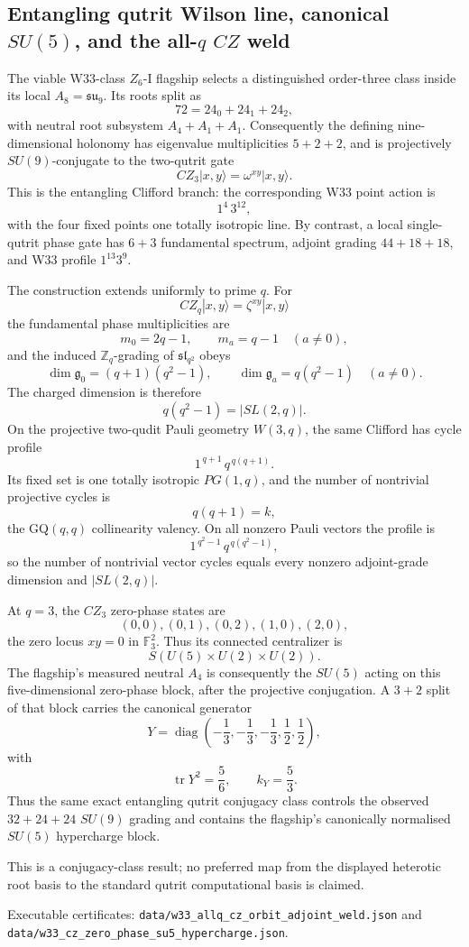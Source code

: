 \subsection{Entangling qutrit Wilson line, canonical \(SU(5)\), and the all-\(q\) \(CZ\) weld}
\label{sec:20260918-cz-su5-allq}

The viable W33-class \(Z_6\)-I flagship selects a distinguished order-three
class inside its local \(A_8=\mathfrak{su}_9\).  Its roots split as
\[
72=24_0+24_1+24_2,
\]
with neutral root subsystem \(A_4+A_1+A_1\).  Consequently the defining
nine-dimensional holonomy has eigenvalue multiplicities \(5+2+2\), and is
projectively \(SU(9)\)-conjugate to the two-qutrit gate
\[
CZ_3|x,y\rangle=\omega^{xy}|x,y\rangle.
\]
This is the entangling Clifford branch: the corresponding W33 point action is
\[
1^4\,3^{12},
\]
with the four fixed points one totally isotropic line.  By contrast, a local
single-qutrit phase gate has \(6+3\) fundamental spectrum, adjoint grading
\(44+18+18\), and W33 profile \(1^{13}3^9\).

The construction extends uniformly to prime \(q\).  For
\[
CZ_q|x,y\rangle=\zeta^{xy}|x,y\rangle
\]
the fundamental phase multiplicities are
\[
m_0=2q-1,\qquad m_a=q-1\quad(a\ne0),
\]
and the induced \(\mathbb Z_q\)-grading of \(\mathfrak{sl}_{q^2}\) obeys
\[
\dim\mathfrak g_0=(q+1)(q^2-1),\qquad
\dim\mathfrak g_a=q(q^2-1)\quad(a\ne0).
\]
The charged dimension is therefore
\[
q(q^2-1)=|SL(2,q)|.
\]
On the projective two-qudit Pauli geometry \(W(3,q)\), the same Clifford has
cycle profile
\[
1^{\,q+1}\,q^{\,q(q+1)}.
\]
Its fixed set is one totally isotropic \(PG(1,q)\), and the number of
nontrivial projective cycles is
\[
q(q+1)=k,
\]
the GQ\((q,q)\) collinearity valency.  On all nonzero Pauli vectors the profile
is
\[
1^{\,q^2-1}\,q^{\,q(q^2-1)},
\]
so the number of nontrivial vector cycles equals every nonzero adjoint-grade
dimension and \(|SL(2,q)|\).

At \(q=3\), the \(CZ_3\) zero-phase states are
\[
(0,0),(0,1),(0,2),(1,0),(2,0),
\]
the zero locus \(xy=0\) in \(\mathbb F_3^2\).  Thus its connected centralizer is
\[
S(U(5)\times U(2)\times U(2)).
\]
The flagship's measured neutral \(A_4\) is consequently the \(SU(5)\) acting
on this five-dimensional zero-phase block, after the projective conjugation.
A \(3+2\) split of that block carries the canonical generator
\[
Y=\operatorname{diag}\left(-\frac13,-\frac13,-\frac13,
                           \frac12,\frac12\right),
\]
with
\[
\operatorname{tr}Y^2=\frac56,\qquad k_Y=\frac53.
\]
Thus the same exact entangling qutrit conjugacy class controls the observed
\(32+24+24\) \(SU(9)\) grading and contains the flagship's canonically
normalised \(SU(5)\) hypercharge block.

This is a conjugacy-class result; no preferred map from the displayed heterotic
root basis to the standard qutrit computational basis is claimed.

Executable certificates:
\texttt{data/w33\_allq\_cz\_orbit\_adjoint\_weld.json} and
\texttt{data/w33\_cz\_zero\_phase\_su5\_hypercharge.json}.
